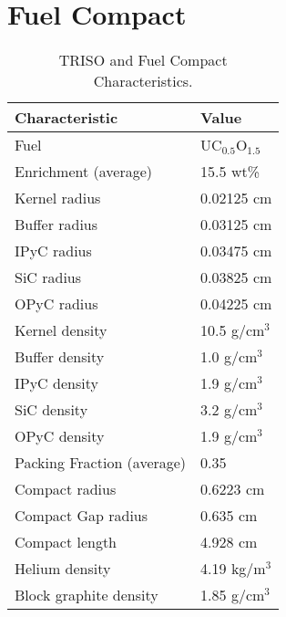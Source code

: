 \documentclass[11pt,letterpaper]{article}
\begin{document}

\section{Fuel Compact}

	\begin{table}[]
		\centering
	    \caption{TRISO and Fuel Compact Characteristics.}
	    \label{tab:compact}
		\begin{tabular}{l|l}
		\hline
		Characteristic                   & Value                \\ \hline
		Fuel                             & UC$_{0.5}$O$_{1.5}$  \\
		Enrichment (average)             & 15.5 wt\%            \\
		Kernel radius                    & 0.02125 cm           \\
		Buffer radius                    & 0.03125 cm           \\
		IPyC radius                      & 0.03475 cm           \\
		SiC radius                       & 0.03825 cm           \\
		OPyC radius                      & 0.04225 cm           \\
    	Kernel density                   & 10.5 g/cm$^3$        \\
		Buffer density                   & 1.0 g/cm$^3$         \\
		IPyC density                     & 1.9 g/cm$^3$         \\
		SiC density                      & 3.2 g/cm$^3$         \\
		OPyC density                     & 1.9 g/cm$^3$         \\
		Packing Fraction (average)       & 0.35                 \\
		Compact radius                   & 0.6223 cm            \\
		Compact Gap radius               & 0.635 cm             \\
		Compact length                   & 4.928 cm             \\ 
        Helium density           		 & 4.19 kg/m$^3$        \\
        Block graphite density           & 1.85 g/cm$^3$        \\ \hline

		\end{tabular}
	\end{table}

\pagebreak


\end{document}
